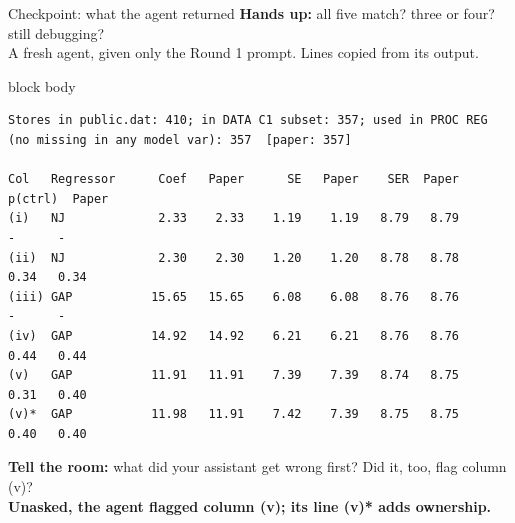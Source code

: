 \documentclass[aspectratio=169,11pt]{beamer}
\begin{document}
\begin{frame}[fragile]{Checkpoint: what the agent returned}
\textbf{Hands up:} all five match? \quad three or four? \quad still debugging?\\[0.4em]
{\footnotesize A fresh agent, given only the Round 1 prompt. Lines copied from its output.}
\begin{beamercolorbox}[sep=4pt]{block body}
\fontsize{6.4}{7.4}\selectfont
\begin{verbatim}
Stores in public.dat: 410; in DATA C1 subset: 357; used in PROC REG (no missing in any model var): 357  [paper: 357]

Col   Regressor      Coef   Paper      SE   Paper    SER  Paper  p(ctrl)  Paper
(i)   NJ             2.33    2.33    1.19    1.19   8.79   8.79        -      -
(ii)  NJ             2.30    2.30    1.20    1.20   8.78   8.78     0.34   0.34
(iii) GAP           15.65   15.65    6.08    6.08   8.76   8.76        -      -
(iv)  GAP           14.92   14.92    6.21    6.21   8.76   8.76     0.44   0.44
(v)   GAP           11.91   11.91    7.39    7.39   8.74   8.75     0.31   0.40
(v)*  GAP           11.98   11.91    7.42    7.39   8.75   8.75     0.40   0.40
\end{verbatim}
\end{beamercolorbox}
\vspace{0.3em}
\small\textbf{Tell the room:} what did your assistant get wrong first? Did it, too, flag column (v)?\\
{\footnotesize\color{accent}\bfseries Unasked, the agent flagged column (v); its line (v)* adds ownership.}
\end{frame}
\end{document}
